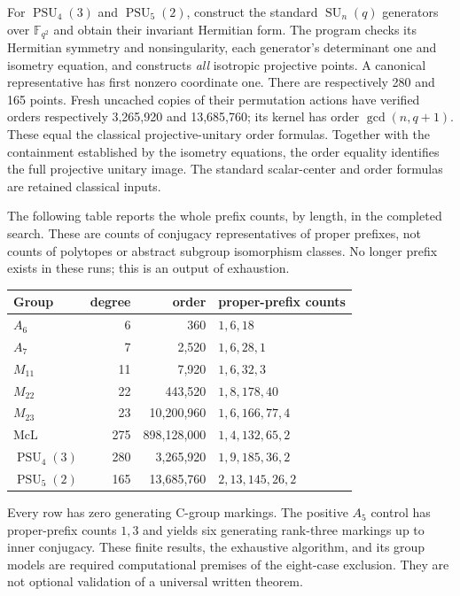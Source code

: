 \documentclass[11pt,a4paper]{article}
\begin{document}
For $\operatorname{PSU}_4(3)$ and $\operatorname{PSU}_5(2)$, construct the
standard $\operatorname{SU}_n(q)$ generators over $\mathbb F_{q^2}$ and
obtain their invariant Hermitian form. The program checks its Hermitian
symmetry and nonsingularity, each generator's determinant one and isometry
equation, and constructs \emph{all} isotropic projective points. A canonical
representative has first nonzero coordinate one. There are respectively
280 and 165 points. Fresh uncached copies of their permutation actions have verified orders respectively
3,265,920 and 13,685,760; its kernel has order $\gcd(n,q+1)$.
These equal the classical projective-unitary order formulas. Together with
the containment established by the isometry equations, the order equality
identifies the full projective unitary image. The standard scalar-center
and order formulas are retained classical inputs.

The following table reports the whole prefix counts, by length, in the
completed search. These are counts of conjugacy representatives of proper
prefixes, not counts of polytopes or abstract subgroup isomorphism classes.
No longer prefix exists in these runs; this is an output of exhaustion.
\begin{center}
\begin{tabular}{lrrl}
\toprule
Group&degree&order&proper-prefix counts\\\midrule
$A_6$&6&360&$1,6,18$\\
$A_7$&7&2,520&$1,6,28,1$\\
$M_{11}$&11&7,920&$1,6,32,3$\\
$M_{22}$&22&443,520&$1,8,178,40$\\
$M_{23}$&23&10,200,960&$1,6,166,77,4$\\
$\mathrm{McL}$&275&898,128,000&$1,4,132,65,2$\\
$\operatorname{PSU}_4(3)$&280&3,265,920&$1,9,185,36,2$\\
$\operatorname{PSU}_5(2)$&165&13,685,760&$2,13,145,26,2$\\\bottomrule
\end{tabular}
\end{center}
Every row has zero generating C-group markings. The positive $A_5$ control
has proper-prefix counts $1,3$ and yields six generating rank-three markings
up to inner conjugacy. These finite results, the exhaustive algorithm, and
its group models are required computational premises of the eight-case
exclusion. They are not optional validation of a universal written theorem.
\end{document}
